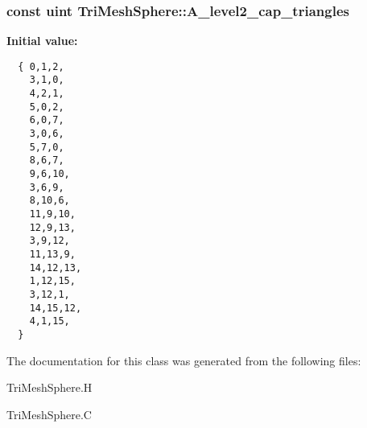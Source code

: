 \subsubsection{\setlength{\rightskip}{0pt plus 5cm}const uint Tri\-Mesh\-Sphere::A\_\-level2\_\-cap\_\-triangles\hspace{0.3cm}{\tt  [static, private]}}\label{classSimSite3D_1_1geometry_1_1TriMeshSphere_58db5fd91484c9fd014384310be33341}


\textbf{Initial value:}

\begin{Code}\begin{verbatim} 
  { 0,1,2,
    3,1,0,
    4,2,1,
    5,0,2,
    6,0,7,
    3,0,6,
    5,7,0,
    8,6,7,
    9,6,10,
    3,6,9,
    8,10,6,
    11,9,10,
    12,9,13,
    3,9,12,
    11,13,9,
    14,12,13,
    1,12,15,
    3,12,1,
    14,15,12,
    4,1,15,
  }
\end{verbatim}\end{Code}


The documentation for this class was generated from the following files:\begin{CompactItemize}
\item 
Tri\-Mesh\-Sphere.H\item 
Tri\-Mesh\-Sphere.C\end{CompactItemize}
